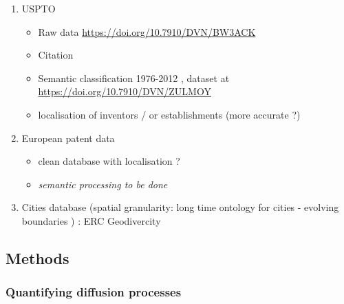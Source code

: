 \begin{enumerate}
	\item USPTO
    \begin{itemize}
    	\item Raw data \url{https://doi.org/10.7910/DVN/BW3ACK}
        \item Citation
        \item Semantic classification 1976-2012 \cite{bergeaud2017classifying}, dataset at \url{https://doi.org/10.7910/DVN/ZULMOY}
        \item localisation of inventors / or establishments (more accurate ?) \cite{li2014disambiguation}
    \end{itemize}
	\item European patent data 
    \begin{itemize}
    	\item clean database with localisation ?
        \item \textit{semantic processing to be done}
     \end{itemize}
	\item Cities database (spatial granularity: long time ontology for cities - evolving boundaries \cite{bretagnolle2009villes}) : ERC Geodivercity
\end{enumerate}


\subsection{Methods}

\subsubsection{Quantifying diffusion processes}

